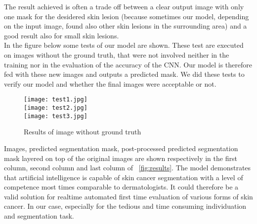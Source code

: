 \documentclass[12pt,a4paper,oneside]{report} %
\begin{document}
The result achieved is often a trade off between a clear output image with only one mask for the desidered skin lesion (because sometimes our model, depending on the input image, 
found also other skin lesions in the surrounding area) and a good result also for small skin lesions.\\
In the figure below some tests of our model are shown.
These test are executed on images without the ground truth, that were not involved neither in the training nor in the evaluation of the accuracy of the CNN. Our model is therefore fed with these new images and outputs a predicted mask.  We did these tests to verify our model and whether the final images were acceptable or not. 
\newpage
\begin{figure}[h!]
\begin{center}
   \texttt{[image: test1.jpg]}\\
   \texttt{[image: test2.jpg]}\\
   \texttt{[image: test3.jpg]}\\
\caption{Results of image without ground truth}
\label{fig:Resultsofimagewithoutgroundtruth}
\end{center}
\end{figure}

Images, predicted segmentation mask, post-processed predicted segmentation mask layered on top of the original images are shown respectively in the first column, second column and last column of \figurename~\ref{fig:results}. 
The model demonstrates that artificial intelligence is capable of skin cancer segmentation with a level of competence most times comparable to dermatologists. It could therefore be a valid solution for realtime automated first time evaluation of various forms of skin cancer. In our case, especially for the tedious and time consuming individuation and segmentation task.


\end{document}
